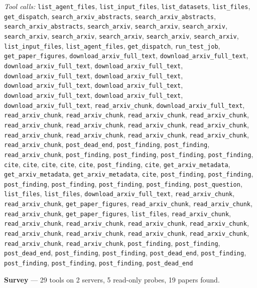 \documentclass[11pt,a4paper]{article}
\begin{document}
\textit{Tool calls:} \texttt{list\_agent\_files}, \texttt{list\_input\_files}, \texttt{list\_datasets}, \texttt{list\_files}, \texttt{get\_dispatch}, \texttt{search\_arxiv\_abstracts}, \texttt{search\_arxiv\_abstracts}, \texttt{search\_arxiv\_abstracts}, \texttt{search\_arxiv}, \texttt{search\_arxiv}, \texttt{search\_arxiv}, \texttt{search\_arxiv}, \texttt{search\_arxiv}, \texttt{search\_arxiv}, \texttt{search\_arxiv}, \texttt{search\_arxiv}, \texttt{list\_input\_files}, \texttt{list\_agent\_files}, \texttt{get\_dispatch}, \texttt{run\_test\_job}, \texttt{get\_paper\_figures}, \texttt{download\_arxiv\_full\_text}, \texttt{download\_arxiv\_full\_text}, \texttt{download\_arxiv\_full\_text}, \texttt{download\_arxiv\_full\_text}, \texttt{download\_arxiv\_full\_text}, \texttt{download\_arxiv\_full\_text}, \texttt{download\_arxiv\_full\_text}, \texttt{download\_arxiv\_full\_text}, \texttt{download\_arxiv\_full\_text}, \texttt{download\_arxiv\_full\_text}, \texttt{download\_arxiv\_full\_text}, \texttt{read\_arxiv\_chunk}, \texttt{download\_arxiv\_full\_text}, \texttt{read\_arxiv\_chunk}, \texttt{read\_arxiv\_chunk}, \texttt{read\_arxiv\_chunk}, \texttt{read\_arxiv\_chunk}, \texttt{read\_arxiv\_chunk}, \texttt{read\_arxiv\_chunk}, \texttt{read\_arxiv\_chunk}, \texttt{read\_arxiv\_chunk}, \texttt{read\_arxiv\_chunk}, \texttt{read\_arxiv\_chunk}, \texttt{read\_arxiv\_chunk}, \texttt{read\_arxiv\_chunk}, \texttt{read\_arxiv\_chunk}, \texttt{post\_dead\_end}, \texttt{post\_finding}, \texttt{post\_finding}, \texttt{read\_arxiv\_chunk}, \texttt{post\_finding}, \texttt{post\_finding}, \texttt{post\_finding}, \texttt{post\_finding}, \texttt{cite}, \texttt{cite}, \texttt{cite}, \texttt{cite}, \texttt{cite}, \texttt{post\_finding}, \texttt{cite}, \texttt{get\_arxiv\_metadata}, \texttt{get\_arxiv\_metadata}, \texttt{get\_arxiv\_metadata}, \texttt{cite}, \texttt{post\_finding}, \texttt{post\_finding}, \texttt{post\_finding}, \texttt{post\_finding}, \texttt{post\_finding}, \texttt{post\_finding}, \texttt{post\_question}, \texttt{list\_files}, \texttt{list\_files}, \texttt{download\_arxiv\_full\_text}, \texttt{read\_arxiv\_chunk}, \texttt{read\_arxiv\_chunk}, \texttt{get\_paper\_figures}, \texttt{read\_arxiv\_chunk}, \texttt{read\_arxiv\_chunk}, \texttt{read\_arxiv\_chunk}, \texttt{get\_paper\_figures}, \texttt{list\_files}, \texttt{read\_arxiv\_chunk}, \texttt{read\_arxiv\_chunk}, \texttt{read\_arxiv\_chunk}, \texttt{read\_arxiv\_chunk}, \texttt{read\_arxiv\_chunk}, \texttt{read\_arxiv\_chunk}, \texttt{read\_arxiv\_chunk}, \texttt{read\_arxiv\_chunk}, \texttt{read\_arxiv\_chunk}, \texttt{read\_arxiv\_chunk}, \texttt{read\_arxiv\_chunk}, \texttt{post\_finding}, \texttt{post\_finding}, \texttt{post\_dead\_end}, \texttt{post\_finding}, \texttt{post\_finding}, \texttt{post\_dead\_end}, \texttt{post\_finding}, \texttt{post\_finding}, \texttt{post\_finding}, \texttt{post\_finding}, \texttt{post\_dead\_end}\par
\textbf{Survey} --- 29 tools on 2 servers, 5 read-only probes, 19 papers found.
\end{document}
